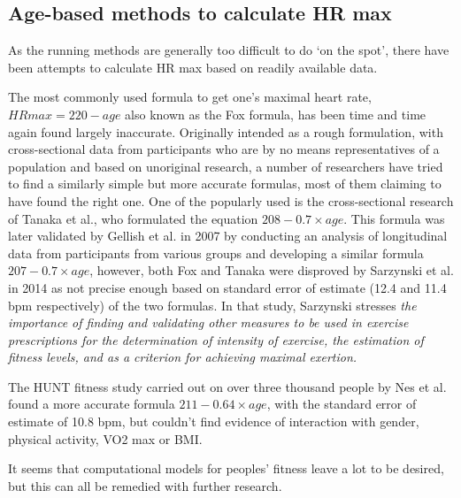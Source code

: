 \subsection*{Age-based methods to calculate HR max}
As the running methods are generally too difficult to do `on the spot', there have been attempts to calculate HR max based on readily available data.

The most commonly used formula to get one's maximal heart rate, $HRmax=220-age$ also known as the Fox formula, has been time and time again found largely inaccurate.
Originally intended as a rough formulation, with cross-sectional data from participants who are by no means representatives of a population\cite{220-hrmax-new-formula} and based on unoriginal research\cite{220-hrmax-disproved},
a number of researchers have tried to find a similarly simple but more accurate formulas, most of them claiming to have found the right one.
One of the popularly used is the cross-sectional research of Tanaka et al., who formulated the equation $208-0.7\times age$.
This formula was later validated by Gellish et al. in 2007 by conducting an analysis of longitudinal data from participants from various groups and developing a similar formula $207-0.7\times age$,
however, both Fox and Tanaka were disproved by Sarzynski et al. in 2014 as not precise enough based on standard error of estimate (12.4 and 11.4 bpm respectively) of the two formulas. \cite{hrmax-age-disproved}
In that study, Sarzynski stresses \textit{the importance of finding and validating other measures to be used in exercise prescriptions for the determination of intensity of exercise, the estimation of fitness levels, and as a criterion for achieving maximal exertion.}

The HUNT fitness study carried out on over three thousand people by Nes et al. found a more accurate formula $211-0.64\times age$, with the standard error of estimate of 10.8 bpm, but couldn't find evidence of interaction with gender, physical activity, VO2 max or BMI. \cite{hrmax-Nes-HUNT}


It seems that computational models for peoples' fitness leave a lot to be desired,
but this can all be remedied with further research.
